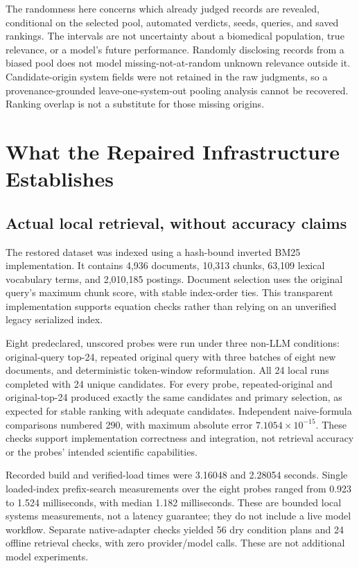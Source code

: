 \documentclass{article}
\begin{document}
The randomness here concerns which already judged records are revealed, conditional on the selected pool, automated verdicts, seeds, queries, and saved rankings. The intervals are not uncertainty about a biomedical population, true relevance, or a model's future performance. Randomly disclosing records from a biased pool does not model missing-not-at-random unknown relevance outside it. Candidate-origin system fields were not retained in the raw judgments, so a provenance-grounded leave-one-system-out pooling analysis cannot be recovered. Ranking overlap is not a substitute for those missing origins.

\section{What the Repaired Infrastructure Establishes}
\label{sec:software}
\subsection{Actual local retrieval, without accuracy claims}
The restored dataset was indexed using a hash-bound inverted BM25 implementation. It contains 4,936 documents, 10,313 chunks, 63,109 lexical vocabulary terms, and 2,010,185 postings. Document selection uses the original query's maximum chunk score, with stable index-order ties. This transparent implementation supports equation checks rather than relying on an unverified legacy serialized index.

Eight predeclared, unscored probes were run under three non-LLM conditions: original-query top-24, repeated original query with three batches of eight new documents, and deterministic token-window reformulation. All 24 local runs completed with 24 unique candidates. For every probe, repeated-original and original-top-24 produced exactly the same candidates and primary selection, as expected for stable ranking with adequate candidates. Independent naive-formula comparisons numbered 290, with maximum absolute error $7.1054\times10^{-15}$. These checks support implementation correctness and integration, not retrieval accuracy or the probes' intended scientific capabilities.

Recorded build and verified-load times were 3.16048 and 2.28054 seconds. Single loaded-index prefix-search measurements over the eight probes ranged from 0.923 to 1.524 milliseconds, with median 1.182 milliseconds. These are bounded local systems measurements, not a latency guarantee; they do not include a live model workflow. Separate native-adapter checks yielded 56 dry condition plans and 24 offline retrieval checks, with zero provider/model calls. These are not additional model experiments.
\end{document}

